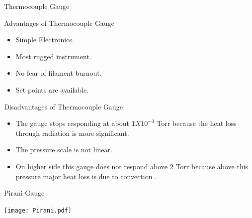 \documentclass[11pt]{beamer}
\begin{document}
\begin{frame}{Thermocouple Gauge}

	\begin{block}{Advantages of Thermocouple Gauge}
      
        \begin{itemize}
          \item    Simple Electronics.
          \item    Most rugged instrument.
          \item    No fear of filament burnout.
          \item    Set points are available.   
        \end{itemize}
	
	\end{block}

\begin{block}{Disadvantages of Thermocouple Gauge}
      
        \begin{itemize}
             
          \item     The gauge stops responding at about $1X 10^{-3}$ Torr because the heat loss through radiation is more significant. 
          \item     The pressure scale is not linear.
          \item     On higher side this gauge does not respond above 2 Torr because above this pressure major heat loss is due to convection .   
                
        \end{itemize}
	
	\end{block}

\end{frame}


\begin{frame}{Pirani Gauge}
\begin{center}
			\texttt{[image: Pirani.pdf]}
		\end{center}
\end{frame}
\end{document}
